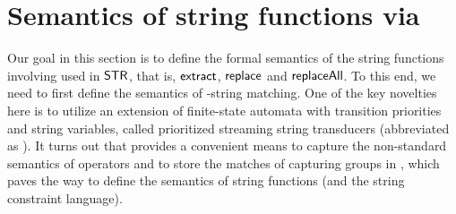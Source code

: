 
\section{Semantics of string functions via {\PSST}}

Our goal in this section is to define the formal semantics of the string functions involving {\regexp} used in $\mathsf{STR}$, that is, $\mathsf{extract}$, $\mathsf{replace}$ and $\mathsf{replaceAll}$. To this end, we need to first define the semantics of {\regexp}-string matching. One of the key novelties here is to utilize an extension of finite-state automata with transition priorities and string variables, called prioritized streaming string transducers (abbreviated as \PSST). It turns out that {\PSST} provides a convenient means to capture the non-standard semantics of {\regexp} operators and to store the matches of capturing groups in {\regexp}, which paves the way to define the semantics of string functions (and the string constraint language). 




